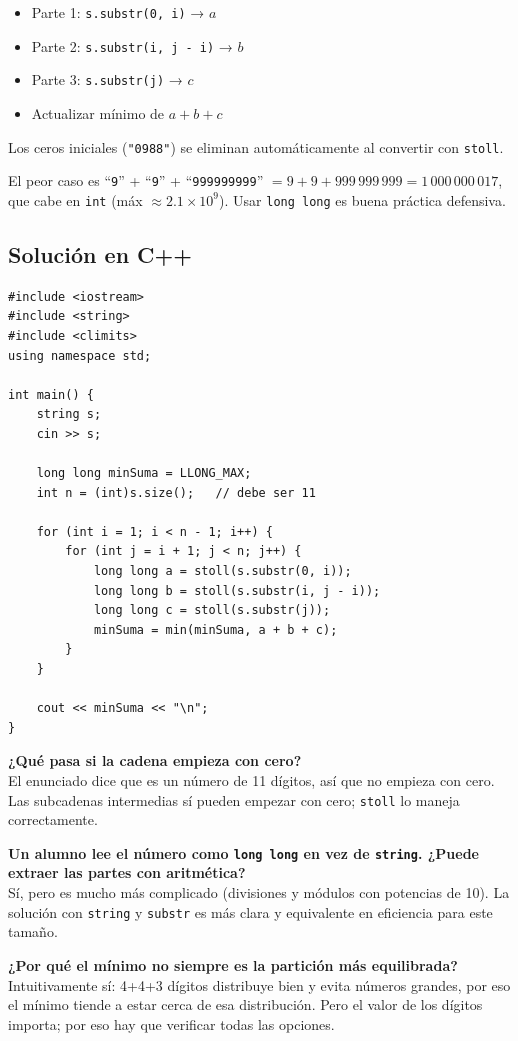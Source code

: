 \documentclass[12pt, oneside]{article}
\begin{document}
\begin{itemize}
  \item Parte 1: \texttt{s.substr(0, i)} → $a$
  \item Parte 2: \texttt{s.substr(i, j - i)} → $b$
  \item Parte 3: \texttt{s.substr(j)} → $c$
  \item Actualizar mínimo de $a + b + c$
\end{itemize}

Los ceros iniciales (\texttt{"0988"}) se eliminan automáticamente al
convertir con \texttt{stoll}.

\begin{notaprofesor}
  El peor caso es ``\texttt{9}'' + ``\texttt{9}'' + ``\texttt{999999999}''
  $= 9 + 9 + 999\,999\,999 = 1\,000\,000\,017$, que cabe en \texttt{int}
  (máx $\approx 2.1 \times 10^9$).  Usar \texttt{long long} es buena
  práctica defensiva.
\end{notaprofesor}

\subsection{Solución en C++}

\begin{verbatim}
#include <iostream>
#include <string>
#include <climits>
using namespace std;

int main() {
    string s;
    cin >> s;

    long long minSuma = LLONG_MAX;
    int n = (int)s.size();   // debe ser 11

    for (int i = 1; i < n - 1; i++) {
        for (int j = i + 1; j < n; j++) {
            long long a = stoll(s.substr(0, i));
            long long b = stoll(s.substr(i, j - i));
            long long c = stoll(s.substr(j));
            minSuma = min(minSuma, a + b + c);
        }
    }

    cout << minSuma << "\n";
}
\end{verbatim}

\begin{notaprofesor}
  \textbf{¿Qué pasa si la cadena empieza con cero?}\\
  El enunciado dice que es un número de 11 dígitos, así que no empieza
  con cero.  Las subcadenas intermedias sí pueden empezar con cero;
  \texttt{stoll} lo maneja correctamente.

  \medskip
  \textbf{Un alumno lee el número como \texttt{long long} en vez de
  \texttt{string}.  ¿Puede extraer las partes con aritmética?}\\
  Sí, pero es mucho más complicado (divisiones y módulos con potencias
  de 10).  La solución con \texttt{string} y \texttt{substr} es
  más clara y equivalente en eficiencia para este tamaño.

  \medskip
  \textbf{¿Por qué el mínimo no siempre es la partición más equilibrada?}\\
  Intuitivamente sí: 4+4+3 dígitos distribuye bien y evita números
  grandes, por eso el mínimo tiende a estar cerca de esa distribución.
  Pero el valor de los dígitos importa; por eso hay que verificar
  todas las opciones.
\end{notaprofesor}
\end{document}
